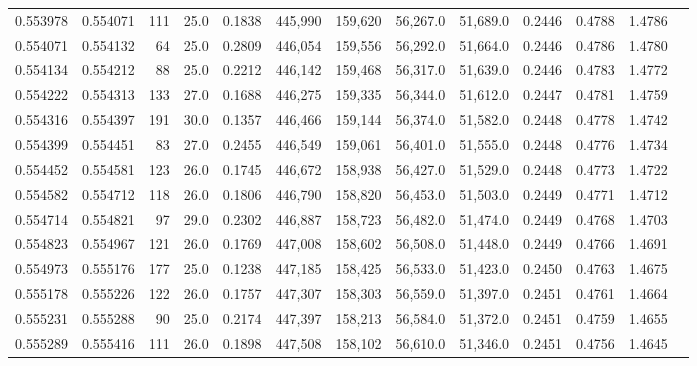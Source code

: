 \begin{tabular}{rrrrrrrrrrrrr}
0.553978 & 0.554071 &   111 & 25.0 &                                     0.1838 & 445,990 & 159,620 &  56,267.0 &  51,689.0 & 0.2446 & 0.4788 & 1.4786 \\
0.554071 & 0.554132 &    64 & 25.0 &                                     0.2809 & 446,054 & 159,556 &  56,292.0 &  51,664.0 & 0.2446 & 0.4786 & 1.4780 \\
0.554134 & 0.554212 &    88 & 25.0 &                                     0.2212 & 446,142 & 159,468 &  56,317.0 &  51,639.0 & 0.2446 & 0.4783 & 1.4772 \\
0.554222 & 0.554313 &   133 & 27.0 &                                     0.1688 & 446,275 & 159,335 &  56,344.0 &  51,612.0 & 0.2447 & 0.4781 & 1.4759 \\
0.554316 & 0.554397 &   191 & 30.0 &                                     0.1357 & 446,466 & 159,144 &  56,374.0 &  51,582.0 & 0.2448 & 0.4778 & 1.4742 \\
0.554399 & 0.554451 &    83 & 27.0 &                                     0.2455 & 446,549 & 159,061 &  56,401.0 &  51,555.0 & 0.2448 & 0.4776 & 1.4734 \\
0.554452 & 0.554581 &   123 & 26.0 &                                     0.1745 & 446,672 & 158,938 &  56,427.0 &  51,529.0 & 0.2448 & 0.4773 & 1.4722 \\
0.554582 & 0.554712 &   118 & 26.0 &                                     0.1806 & 446,790 & 158,820 &  56,453.0 &  51,503.0 & 0.2449 & 0.4771 & 1.4712 \\
0.554714 & 0.554821 &    97 & 29.0 &                                     0.2302 & 446,887 & 158,723 &  56,482.0 &  51,474.0 & 0.2449 & 0.4768 & 1.4703 \\
0.554823 & 0.554967 &   121 & 26.0 &                                     0.1769 & 447,008 & 158,602 &  56,508.0 &  51,448.0 & 0.2449 & 0.4766 & 1.4691 \\
0.554973 & 0.555176 &   177 & 25.0 &                                     0.1238 & 447,185 & 158,425 &  56,533.0 &  51,423.0 & 0.2450 & 0.4763 & 1.4675 \\
0.555178 & 0.555226 &   122 & 26.0 &                                     0.1757 & 447,307 & 158,303 &  56,559.0 &  51,397.0 & 0.2451 & 0.4761 & 1.4664 \\
0.555231 & 0.555288 &    90 & 25.0 &                                     0.2174 & 447,397 & 158,213 &  56,584.0 &  51,372.0 & 0.2451 & 0.4759 & 1.4655 \\
0.555289 & 0.555416 &   111 & 26.0 &                                     0.1898 & 447,508 & 158,102 &  56,610.0 &  51,346.0 & 0.2451 & 0.4756 & 1.4645 \\

\end{tabular}
